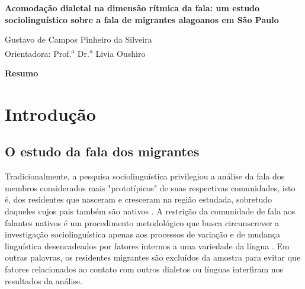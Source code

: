 \documentclass[
    a4paper,	%
    12pt,	%
    ]{article}	%
\begin{document}
	
{ %

	\begin{center}
		{\bfseries\Large\sffamily
		    Acomodação dialetal na dimensão rítmica da fala: um estudo sociolinguístico
		    sobre a fala de migrantes alagoanos em São Paulo
		}
	\end{center}
}
	
\vspace{0.35em}

{ %

	\begin{flushright} 
		Gustavo de Campos Pinheiro da Silveira \\ 
		\vspace{5pt}
		Orientadora: Prof.\textsuperscript{a} Dr.\textsuperscript{a} Livia Oushiro
	\end{flushright}

	\begin{center} 
	    {\bfseries\sffamily Resumo} \\ 
	\end{center}
	\par
	\vspace{0.35em}
		
}

\section{Introdução} 
\label{intro}

	\subsection{O estudo da fala dos migrantes}

Tradicionalmente, a pesquisa sociolinguística privilegiou a análise da fala dos
membros considerados mais "prototípicos" de suas respectivas comunidades, isto
é, dos residentes que nasceram e cresceram na região estudada, sobretudo
daqueles cujos pais também são nativos \citep{Britain1992, Kerswill1993,
Milroy2002, Oushiro2016}. A restrição da comunidade de fala aos falantes nativos
é um procedimento metodológico que busca circunscrever a investigação
sociolinguística apenas aos processos de variação e de mudança linguística
desencadeados por fatores internos a uma variedade da língua \citep[][p.
20]{Milroy2002, Labov2001}. Em outras palavras, os residentes migrantes são
excluídos da amostra para evitar que fatores relacionados ao contato com outros
dialetos ou línguas interfiram nos resultados da análise.
\end{document}
